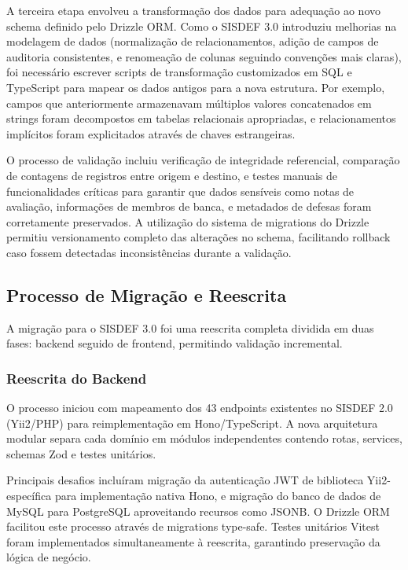 \documentclass[nonacm, sigconf]{acmart}
\begin{document}
A terceira etapa envolveu a transformação dos dados para adequação ao novo schema definido pelo Drizzle ORM. Como o SISDEF 3.0 introduziu melhorias na modelagem de dados (normalização de relacionamentos, adição de campos de auditoria consistentes, e renomeação de colunas seguindo convenções mais claras), foi necessário escrever scripts de transformação customizados em SQL e TypeScript para mapear os dados antigos para a nova estrutura. Por exemplo, campos que anteriormente armazenavam múltiplos valores concatenados em strings foram decompostos em tabelas relacionais apropriadas, e relacionamentos implícitos foram explicitados através de chaves estrangeiras.

O processo de validação incluiu verificação de integridade referencial, comparação de contagens de registros entre origem e destino, e testes manuais de funcionalidades críticas para garantir que dados sensíveis como notas de avaliação, informações de membros de banca, e metadados de defesas foram corretamente preservados. A utilização do sistema de migrations do Drizzle permitiu versionamento completo das alterações no schema, facilitando rollback caso fossem detectadas inconsistências durante a validação.


\subsection{Processo de Migração e Reescrita}
\label{section:migration_process}

A migração para o SISDEF 3.0 foi uma reescrita completa dividida em duas fases: backend seguido de frontend, permitindo validação incremental.

\subsubsection{Reescrita do Backend}

O processo iniciou com mapeamento dos 43 endpoints existentes no SISDEF 2.0 (Yii2/PHP) para reimplementação em Hono/TypeScript. A nova arquitetura modular separa cada domínio em módulos independentes contendo rotas, services, schemas Zod e testes unitários.

Principais desafios incluíram migração da autenticação JWT de biblioteca Yii2-específica para implementação nativa Hono, e migração do banco de dados de MySQL para PostgreSQL aproveitando recursos como JSONB. O Drizzle ORM facilitou este processo através de migrations type-safe. Testes unitários Vitest foram implementados simultaneamente à reescrita, garantindo preservação da lógica de negócio.
\end{document}
